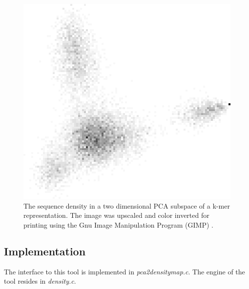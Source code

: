\begin{figure}
  \begin{center}
    \includegraphics{pca-density.png}
    \caption{The sequence density in a two dimensional PCA subspace of
    a k-mer representation. The image was upscaled and color inverted
    for printing using the Gnu Image Manipulation Program (GIMP)
    \cite{gimp}.}
    \label{fig-pca2densitymap}
  \end{center}
\end{figure}

\subsection{Implementation}
The interface to this tool is implemented in \emph{pca2densitymap.c}.
The engine of the tool resides in \emph{density.c}.
